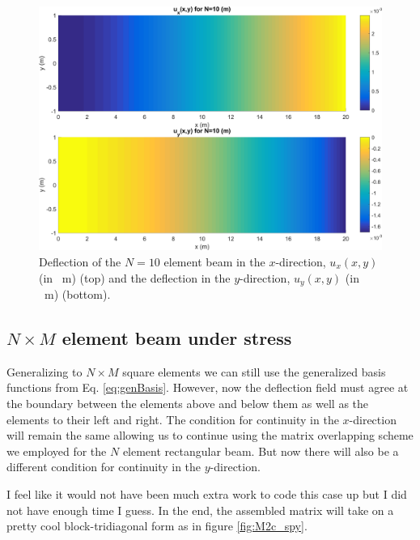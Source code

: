 \documentclass[11pt]{article}
\begin{document}
\begin{figure}[!htb]
  \centering
  \includegraphics[width=\linewidth]{q2b_uxuy_N10.png}
  \caption{Deflection of the $N=10$ element beam in the $x$-direction, $u_x(x,y)$ (in \SI{}{\m}) (top) and the deflection in the $y$-direction, $u_y(x,y)$ (in \SI{}{\m}) (bottom).}
  \label{fig:q2b_uxuy_N10}
\end{figure}
\clearpage

\subsection{$N \times M$ element beam under stress}
Generalizing to $N \times M$ square elements we can still use the generalized basis functions from Eq. \eqref{eq:genBasis}. However, now the deflection field must agree at the boundary between the elements above and below them as well as the elements to their left and right. The condition for continuity in the $x$-direction will remain the same allowing us to continue using the matrix overlapping scheme we employed for the $N$ element rectangular beam. But now there will also be a different condition for continuity in the $y$-direction.

I feel like it would not have been much extra work to code this case up but I did not have enough time I guess. In the end, the assembled matrix will take on a pretty cool block-tridiagonal form as in figure \ref{fig:M2c_spy}.
\end{document}
